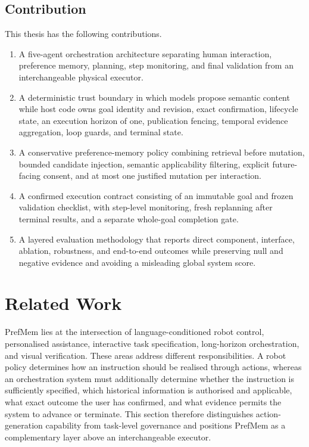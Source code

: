 \documentclass{article}
\begin{document}
\subsection{Contribution}
This thesis has the following contributions.
\begin{enumerate}
    \item A five-agent orchestration architecture separating human interaction, preference memory, planning, step monitoring, and final validation from an interchangeable physical executor.

    \item A deterministic trust boundary in which models propose semantic content while host code owns goal identity and revision, exact confirmation, lifecycle state, an execution horizon of one, publication fencing, temporal evidence aggregation, loop guards, and terminal state.

    \item A conservative preference-memory policy combining retrieval before mutation, bounded candidate injection, semantic applicability filtering, explicit future-facing consent, and at most one justified mutation per interaction.

    \item A confirmed execution contract consisting of an immutable goal and frozen validation checklist, with step-level monitoring, fresh replanning after terminal results, and a separate whole-goal completion gate.

    \item A layered evaluation methodology that reports direct component, interface, ablation, robustness, and end-to-end outcomes while preserving null and negative evidence and avoiding a misleading global system score.
\end{enumerate}




\section{Related Work}
\label{sec:related-work}

PrefMem lies at the intersection of language-conditioned robot control,
personalised assistance, interactive task specification, long-horizon
orchestration, and visual verification. These areas address different
responsibilities. A robot policy determines how an instruction should be
realised through actions, whereas an orchestration system must additionally
determine whether the instruction is sufficiently specified, which historical
information is authorised and applicable, what exact outcome the user has
confirmed, and what evidence permits the system to advance or terminate. This
section therefore distinguishes action-generation capability from task-level
governance and positions PrefMem as a complementary layer above an
interchangeable executor.
\end{document}
